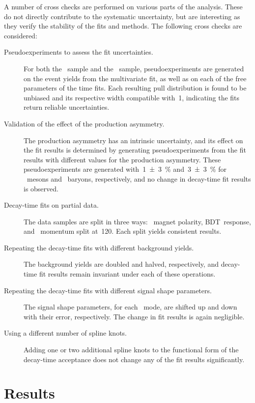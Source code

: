 A number of cross checks are performed on various parts of the analysis.
These do not directly contribute to the systematic uncertainty, but are interesting as they verify the stability of the fits and methods.
The following cross checks are considered:
%
\begin{description}
    \item[Pseudoexperiments to assess the fit uncertainties.]
        For both the \BsDsPi~sample and the \BsDsK~sample, pseudoexperiments are generated on the event yields from the multivariate fit, as well as on each of the free parameters of the time fits.
        Each resulting pull distribution is found to be unbiased and its respective width compatible with~\num{1}, indicating the fits return reliable uncertainties.
    \item[Validation of the effect of the production asymmetry.]
        The production asymmetry has an intrinsic uncertainty, and its effect on the fit results is determined by generating pseudoexperiments from the fit results with different values for the production asymmetry.
        These pseudoexperiments are generated with~\SI{1 +- 3}{\percent} and~\SI{3 +- 3}{\percent} for \bquark~mesons and \Lb~baryons, respectively, and no change in decay-time fit results is observed.
    \item[Decay-time fits on partial data.]
        The data samples are split in three ways: \lhcb~magnet polarity, BDT~response, and \Bs~momentum split at~\SI{120}{\GeVc}.
        Each split yields consistent results.
    \item[Repeating the decay-time fits with different background yields.]
        The background yields are doubled and halved, respectively, and decay-time fit results remain invariant under each of these operations.
    \item[Repeating the decay-time fits with different signal shape parameters.]
        The signal shape parameters, for each \Dspm~mode, are shifted up and down with their error, respectively.
        The change in fit results is again negligible.
    \item[Using a different number of spline knots.]
        Adding one or two additional spline knots to the functional form of the decay-time acceptance does not change any of the fit results significantly.
\end{description}

\clearpage
\section{Results} \label{sec:BsDsK_TD_Results}

